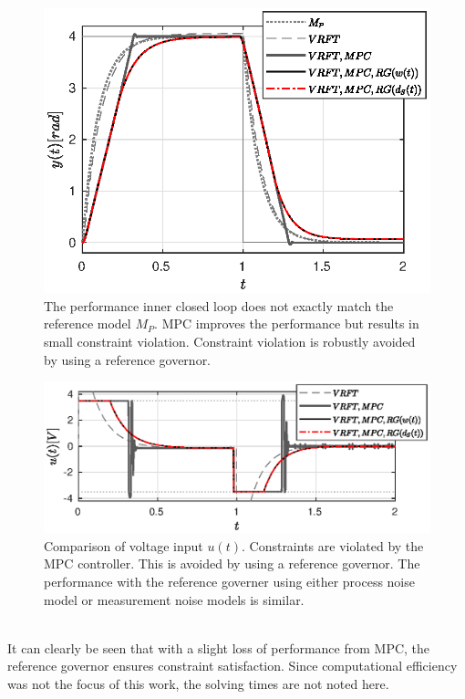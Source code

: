 \documentclass[letterpaper, 10 pt, conference]{ieeeconf}  %
\begin{document}
\begin{enumerate}
	\begin{figure}[h]
		\hspace{20pt}
		\includegraphics[scale = 0.65]{VRFT_vs_MPC.eps}
		\caption{The performance inner closed loop does not exactly match the reference model $M_P$. MPC improves the performance but results in small constraint violation. Constraint violation is robustly avoided by using a reference governor.}
		\label{VRFT_y}
	\end{figure} 
	\begin{figure}[h]
		\includegraphics[scale = 0.65]{VRFT_vs_MPC_u.eps}
		\caption{Comparison of voltage input $u(t)$. Constraints are violated by the MPC controller. This is avoided by using a reference governor. The performance with the reference governer using either process noise model or measurement noise models is similar.}
		\label{VRFT_u}
	\end{figure} \\
	\indent
	It can clearly be seen that with a slight loss of performance from MPC, the reference governor ensures constraint satisfaction. Since computational efficiency was not the focus of this work, the solving times are not noted here.

\end{enumerate}
\end{document}
